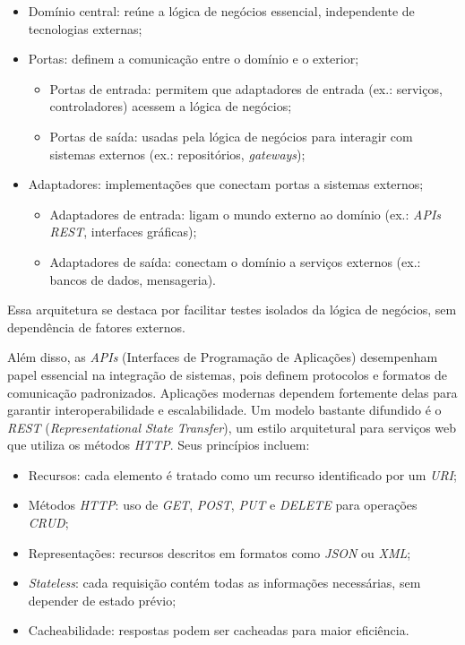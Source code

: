 \documentclass[english,brazilian]{UNISINOSartigo} %
\begin{document}
\begin{itemize}[leftmargin=1cm, itemsep=0.1em, topsep=0.1em]
    \item Domínio central: reúne a lógica de negócios essencial, independente de tecnologias externas;
    \item Portas: definem a comunicação entre o domínio e o exterior;
    \begin{itemize}[leftmargin=1.2cm, itemsep=0.1em, topsep=0.1em]
        \item Portas de entrada: permitem que adaptadores de entrada (ex.: serviços, controladores) acessem a lógica de negócios;
        \item Portas de saída: usadas pela lógica de negócios para interagir com sistemas externos (ex.: repositórios, \textit{gateways});
    \end{itemize}
    \item Adaptadores: implementações que conectam portas a sistemas externos;
    \begin{itemize}[leftmargin=1.2cm, itemsep=0.1em, topsep=0.1em] 
        \item Adaptadores de entrada: ligam o mundo externo ao domínio (ex.: \textit{APIs REST}, interfaces gráficas);
        \item Adaptadores de saída: conectam o domínio a serviços externos (ex.: bancos de dados, mensageria).
    \end{itemize}
\end{itemize}

Essa arquitetura se destaca por facilitar testes isolados da lógica de negócios, sem dependência de fatores externos.

Além disso, as \textit{APIs} (Interfaces de Programação de Aplicações) desempenham papel essencial na integração de sistemas, pois definem protocolos e formatos de comunicação padronizados. Aplicações modernas dependem fortemente delas para garantir interoperabilidade e escalabilidade. Um modelo bastante difundido é o \textit{REST} (\textit{Representational State Transfer}), um estilo arquitetural para serviços web que utiliza os métodos \textit{HTTP}. Seus princípios incluem:

\begin{itemize}[leftmargin=1cm, itemsep=0.1em, topsep=0.1em]
    \item Recursos: cada elemento é tratado como um recurso identificado por um \textit{URI};
    \item Métodos \textit{HTTP}: uso de \textit{GET}, \textit{POST}, \textit{PUT} e \textit{DELETE} para operações \textit{CRUD};
    \item Representações: recursos descritos em formatos como \textit{JSON} ou \textit{XML};
    \item \textit{Stateless}: cada requisição contém todas as informações necessárias, sem depender de estado prévio;
    \item Cacheabilidade: respostas podem ser cacheadas para maior eficiência.
\end{itemize}
\end{document}
